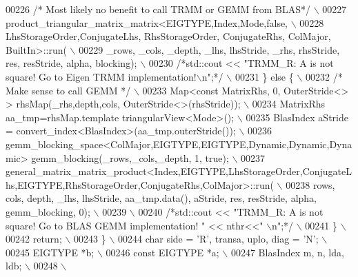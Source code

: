 \begin{DoxyCode}
00226 \textcolor{preprocessor}{     }\textcolor{comment}{/* Most likely no benefit to call TRMM or GEMM from BLAS*/}\textcolor{preprocessor}{ \(\backslash\)}
00227 \textcolor{preprocessor}{       product\_triangular\_matrix\_matrix<EIGTYPE,Index,Mode,false, \(\backslash\)}
00228 \textcolor{preprocessor}{       LhsStorageOrder,ConjugateLhs, RhsStorageOrder, ConjugateRhs, ColMajor, BuiltIn>::run( \(\backslash\)}
00229 \textcolor{preprocessor}{           \_rows, \_cols, \_depth, \_lhs, lhsStride, \_rhs, rhsStride, res, resStride, alpha, blocking); \(\backslash\)}
00230 \textcolor{preprocessor}{       }\textcolor{comment}{/*std::cout << "TRMM\_R: A is not square! Go to Eigen TRMM implementation!\(\backslash\)n";*/}\textcolor{preprocessor}{ \(\backslash\)}
00231 \textcolor{preprocessor}{     \} else \{ \(\backslash\)}
00232 \textcolor{preprocessor}{     }\textcolor{comment}{/* Make sense to call GEMM */}\textcolor{preprocessor}{ \(\backslash\)}
00233 \textcolor{preprocessor}{       Map<const MatrixRhs, 0, OuterStride<> > rhsMap(\_rhs,depth,cols, OuterStride<>(rhsStride)); \(\backslash\)}
00234 \textcolor{preprocessor}{       MatrixRhs aa\_tmp=rhsMap.template triangularView<Mode>(); \(\backslash\)}
00235 \textcolor{preprocessor}{       BlasIndex aStride = convert\_index<BlasIndex>(aa\_tmp.outerStride()); \(\backslash\)}
00236 \textcolor{preprocessor}{       gemm\_blocking\_space<ColMajor,EIGTYPE,EIGTYPE,Dynamic,Dynamic,Dynamic>
       gemm\_blocking(\_rows,\_cols,\_depth, 1, true); \(\backslash\)}
00237 \textcolor{preprocessor}{      
       general\_matrix\_matrix\_product<Index,EIGTYPE,LhsStorageOrder,ConjugateLhs,EIGTYPE,RhsStorageOrder,ConjugateRhs,ColMajor>::run( \(\backslash\)}
00238 \textcolor{preprocessor}{       rows, cols, depth, \_lhs, lhsStride, aa\_tmp.data(), aStride, res, resStride, alpha, gemm\_blocking,
       0); \(\backslash\)}
00239 \textcolor{preprocessor}{\(\backslash\)}
00240 \textcolor{preprocessor}{     }\textcolor{comment}{/*std::cout << "TRMM\_R: A is not square! Go to BLAS GEMM implementation! " << nthr<<" \(\backslash\)n";*/}\textcolor{preprocessor}{ \(\backslash\)}
00241 \textcolor{preprocessor}{     \} \(\backslash\)}
00242 \textcolor{preprocessor}{     return; \(\backslash\)}
00243 \textcolor{preprocessor}{   \} \(\backslash\)}
00244 \textcolor{preprocessor}{   char side = 'R', transa, uplo, diag = 'N'; \(\backslash\)}
00245 \textcolor{preprocessor}{   EIGTYPE *b; \(\backslash\)}
00246 \textcolor{preprocessor}{   const EIGTYPE *a; \(\backslash\)}
00247 \textcolor{preprocessor}{   BlasIndex m, n, lda, ldb; \(\backslash\)}
00248 \textcolor{preprocessor}{\(\backslash\)}

\end{DoxyCode}
